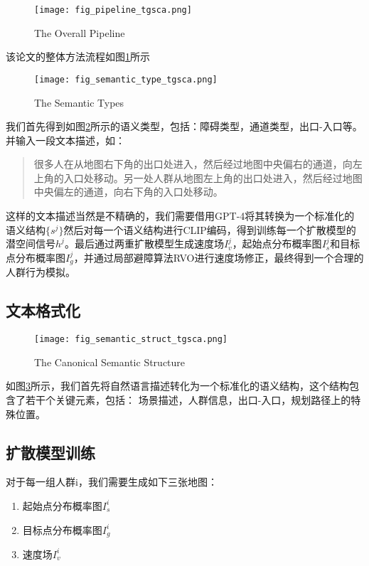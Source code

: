 \begin{figure}[H]
    \texttt{[image: fig\_pipeline\_tgsca.png]}
    \caption{The Overall Pipeline}
    \label{fig:pipeline}
\end{figure}

该论文的整体方法流程如图\ref{fig:pipeline}所示

\begin{figure}[H]
    \texttt{[image: fig\_semantic\_type\_tgsca.png]}        
    \caption{The Semantic Types}
    \label{fig:semantic_type}
\end{figure}

我们首先得到如图\ref{fig:semantic_type}所示的语义类型，包括：障碍类型，通道类型，出口-入口等。并输入一段文本描述，如：
\begin{quote}
    很多人在从地图右下角的出口处进入，然后经过地图中央偏右的通道，向左上角的入口处移动。另一处人群从地图左上角的出口处进入，然后经过地图中央偏左的通道，向右下角的入口处移动。
\end{quote}

这样的文本描述当然是不精确的，我们需要借用GPT-4将其转换为一个标准化的语义结构$\{s^j\}$然后对每一个语义结构进行CLIP编码，得到训练每一个扩散模型的潜空间信号$h^j$。最后通过两重扩散模型生成速度场$I_v^j$，起始点分布概率图$I_s^j$和目标点分布概率图$I_g^j$，并通过局部避障算法RVO进行速度场修正，最终得到一个合理的人群行为模拟。

\subsection{文本格式化}

\begin{figure}[H]
    \texttt{[image: fig\_semantic\_struct\_tgsca.png]}
    \caption{The Canonical Semantic Structure}
    \label{fig:semantic_struct}
\end{figure}

如图\ref{fig:semantic_struct}所示，我们首先将自然语言描述转化为一个标准化的语义结构，这个结构包含了若干个关键元素，包括：
场景描述，人群信息，出口-入口，规划路径上的特殊位置。

\subsection{扩散模型训练}

对于每一组人群i，我们需要生成如下三张地图：

\begin{enumerate}
    \item 起始点分布概率图$I_s^i$
    \item 目标点分布概率图$I_g^i$
    \item 速度场$I_v^i$
\end{enumerate}

